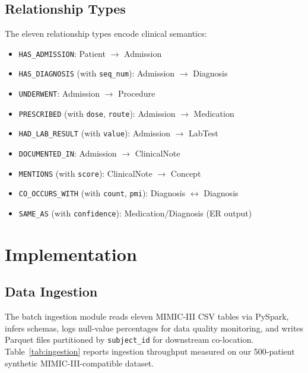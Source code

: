 \documentclass[conference]{IEEEtran}
\begin{document}
\subsection{Relationship Types}

The eleven relationship types encode clinical semantics:

\begin{itemize}
  \item \texttt{HAS\_ADMISSION}: Patient $\to$ Admission
  \item \texttt{HAS\_DIAGNOSIS} (with \texttt{seq\_num}): Admission $\to$ Diagnosis
  \item \texttt{UNDERWENT}: Admission $\to$ Procedure
  \item \texttt{PRESCRIBED} (with \texttt{dose}, \texttt{route}): Admission $\to$ Medication
  \item \texttt{HAD\_LAB\_RESULT} (with \texttt{value}): Admission $\to$ LabTest
  \item \texttt{DOCUMENTED\_IN}: Admission $\to$ ClinicalNote
  \item \texttt{MENTIONS} (with \texttt{score}): ClinicalNote $\to$ Concept
  \item \texttt{CO\_OCCURS\_WITH} (with \texttt{count}, \texttt{pmi}): Diagnosis $\leftrightarrow$ Diagnosis
  \item \texttt{SAME\_AS} (with \texttt{confidence}): Medication/Diagnosis (ER output)
\end{itemize}

\section{Implementation}

\subsection{Data Ingestion}

The batch ingestion module reads eleven MIMIC-III CSV tables via PySpark,
infers schemas, logs null-value percentages for data quality monitoring,
and writes Parquet files partitioned by \texttt{subject\_id} for downstream
co-location.
Table~\ref{tab:ingestion} reports ingestion throughput measured on our
500-patient synthetic MIMIC-III-compatible dataset.
\end{document}
